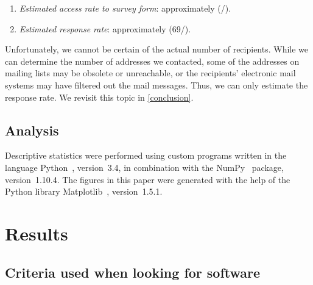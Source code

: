 \documentclass[review]{elsarticle}
\newcommand{\totalRespondents}{69\xspace}
\begin{document}
\begin{enumerate}[itemsep=-0.5ex]

\item \emph{Estimated access rate to survey form}: approximately \accessRate  (\totalClicks/\totalPotentialRecipients).

\item \emph{Estimated response rate}: approximately \populationResponseRate (\totalRespondents/\totalPotentialRecipients).

\end{enumerate}

Unfortunately, we cannot be certain of the actual number of recipients.  While we can determine the number of addresses we contacted, some of the addresses on mailing lists may be obsolete or unreachable, or the recipients' electronic mail systems may have filtered out the mail messages.  Thus, we can only estimate the response rate.  We revisit this topic in \ref{conclusion}.


\subsection{Analysis}

Descriptive statistics were performed using custom programs written in the language Python~\citep{vanRossum1991interactively, perez2011python}, version~3.4, in combination with the NumPy~\citep{vanderwalt2011numpy} package, version~1.10.4.  The figures in this paper were generated with the help of the Python library Matplotlib~\citep{hunter2007matplotlib}, version~1.5.1.










\section{Results}
\label{results}


\subsection{Criteria used when looking for software}
\end{document}

